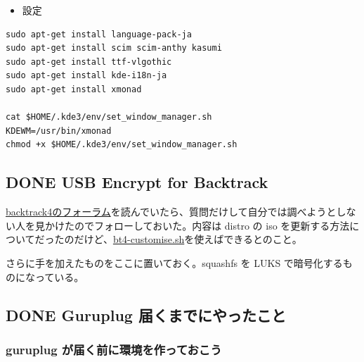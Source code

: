 \documentclass[11pt]{article}
\begin{document}
\begin{itemize}
\item 設定
\end{itemize}

\begin{verbatim}
sudo apt-get install language-pack-ja
sudo apt-get install scim scim-anthy kasumi
sudo apt-get install ttf-vlgothic
sudo apt-get install kde-i18n-ja
sudo apt-get install xmonad

cat $HOME/.kde3/env/set_window_manager.sh
KDEWM=/usr/bin/xmonad
chmod +x $HOME/.kde3/env/set_window_manager.sh
\end{verbatim}
\subsection{{\bfseries\sffamily DONE} USB Encrypt for Backtrack}
\label{sec:org18fe79c}
\href{http://www.backtrack-linux.org/forums/}{backtrack4のフォーラム}を読んでいたら、質問だけして自分では調べようとしない人を見かけたのでフォローしておいた。内容は distro の iso を更新する方法についてだったのだけど、\href{http://www.offensive-security.com/blog/backtrack/customising-backtrack-live-cd-the-easy-way/}{bt4-customise.sh}を使えばできるとのこと。

さらに手を加えたものをここに置いておく。squashfs を LUKS で暗号化するものになっている。
\subsection{{\bfseries\sffamily DONE} Guruplug 届くまでにやったこと}
\label{sec:org2349de2}
\subsubsection{guruplug が届く前に環境を作っておこう}
\label{sec:org562ad63}
\end{document}
